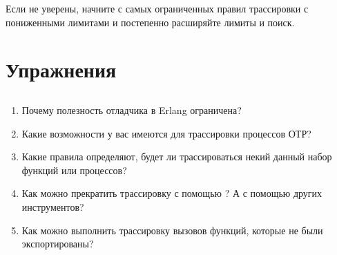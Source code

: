 Если не уверены, начните с самых ограниченных правил трассировки с пониженными лимитами и постепенно расширяйте лимиты и поиск.


\section{Упражнения}

\subsection*{\ReviewTitle{}}

\begin{enumerate}
	\item Почему полезность отладчика в Erlang ограничена?
	\item Какие возможности у вас имеются для трассировки процессов ОТР?
	\item Какие правила определяют, будет ли трассироваться некий данный набор функций или процессов?
	\item Как можно прекратить трассировку с помощью ? А с помощью других инструментов?
	\item Как можно выполнить трассировку вызовов функций, которые не были экспортированы?
\end{enumerate}

\subsection*{\OpenEndedTitle{}}

